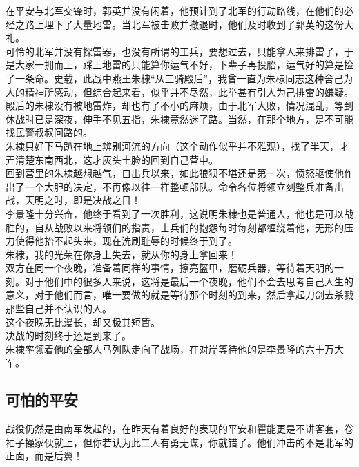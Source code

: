 \begin{multicols}{\theparacolNo}
在平安与北军交锋时，郭英并没有闲着，他预计到了北军的行动路线，在他们的必经之路上埋下了大量地雷。当北军被击败并撤退时，他们及时收到了郭英的这份大礼。\\

可怜的北军并没有探雷器，也没有所谓的工兵，要想过去，只能拿人来排雷了，于是大家一拥而上，踩上地雷的只能算你运气不好，下辈子再投胎，运气好的算是捡了一条命。史载，此战中燕王朱棣“从三骑殿后”，我曾一直为朱棣同志这种舍己为人的精神所感动，但综合起来看，似乎并不尽然，此举甚有引人为己排雷的嫌疑。\\

殿后的朱棣没有被地雷炸，却也有了不小的麻烦，由于北军大败，情况混乱，等到休战时已是深夜，伸手不见五指，朱棣竟然迷了路。当然，在那个地方，是不可能找民警叔叔问路的。\\

朱棣只好下马趴在地上辨别河流的方向（这个动作似乎并不雅观），找了半天，才弄清楚东南西北，这才灰头土脸的回到自己营中。\\

回到营里的朱棣越想越气，自出兵以来，如此狼狈不堪还是第一次，愤怒驱使他作出了一个大胆的决定，不再像以往一样整顿部队。命令各位将领立刻整兵准备出战，天明之时，即是决战之日！\\

李景隆十分兴奋，他终于看到了一次胜利，这说明朱棣也是普通人，他也是可以战胜的，自从战败以来将领们的指责，士兵们的抱怨每时每刻都缠绕着他，无形的压力使得他抬不起头来，现在洗刷耻辱的时候终于到了。\\

朱棣，我的光荣在你身上失去，就从你的身上拿回来！\\

双方在同一个夜晚，准备着同样的事情，擦亮盔甲，磨砺兵器，等待着天明的一刻。对于他们中的很多人来说，这将是最后一个夜晚，他们不会去思考自己人生的意义，对于他们而言，唯一要做的就是等待那个时刻的到来，然后拿起刀剑去杀戮那些自己并不认识的人。\\

这个夜晚无比漫长，却又极其短暂。\\

决战的时刻终于还是到来了。\\

朱棣率领着他的全部人马列队走向了战场，在对岸等待他的是李景隆的六十万大军。\\

\subsection{可怕的平安}
战役仍然是由南军发起的，在昨天有着良好的表现的平安和瞿能更是不讲客套，卷袖子操家伙就上，但你若认为此二人有勇无谋，你就错了。他们冲击的不是北军的正面，而是后翼！\\


\end{multicols}
